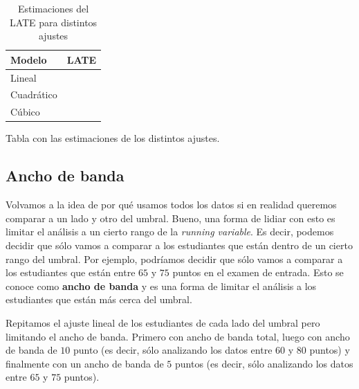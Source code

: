 \documentclass[
  letterpaper,
  DIV=11,
  numbers=noendperiod,
  oneside]{scrreprt}
\begin{document}
\begin{table}
\caption*{
{\large Estimaciones del LATE para distintos ajustes}
} 
\fontsize{12.0pt}{14.4pt}\selectfont
\begin{tabular*}{\linewidth}{@{\extracolsep{\fill}}lr}
\toprule
Modelo & LATE \\ 
\midrule\addlinespace[2.5pt]
Lineal & {\bfseries \cellcolor[HTML]{FFFFE0}{\textcolor[HTML]{000000}{10.8}}} \\ 
Cuadrático & {\bfseries \cellcolor[HTML]{FFFFE0}{\textcolor[HTML]{000000}{5.7}}} \\ 
Cúbico & {\bfseries \cellcolor[HTML]{FFFFE0}{\textcolor[HTML]{000000}{3.6}}} \\ 
\bottomrule
\end{tabular*}
\end{table}

Tabla con las estimaciones de los distintos ajustes.

\hypertarget{ancho-de-banda}{%
\subsection{Ancho de banda}\label{ancho-de-banda}}

Volvamos a la idea de por qué usamos todos los datos si en realidad
queremos comparar a un lado y otro del umbral. Bueno, una forma de
lidiar con esto es limitar el análisis a un cierto rango de la
\emph{running variable}. Es decir, podemos decidir que sólo vamos a
comparar a los estudiantes que están dentro de un cierto rango del
umbral. Por ejemplo, podríamos decidir que sólo vamos a comparar a los
estudiantes que están entre \(65\) y \(75\) puntos en el examen de
entrada. Esto se conoce como \textbf{ancho de banda} y es una forma de
limitar el análisis a los estudiantes que están más cerca del umbral.

Repitamos el ajuste lineal de los estudiantes de cada lado del umbral
pero limitando el ancho de banda. Primero con ancho de banda total,
luego con ancho de banda de \(10\) punto (es decir, sólo analizando los
datos entre \(60\) y \(80\) puntos) y finalmente con un ancho de banda
de \(5\) puntos (es decir, sólo analizando los datos entre \(65\) y
\(75\) puntos).
\end{document}
